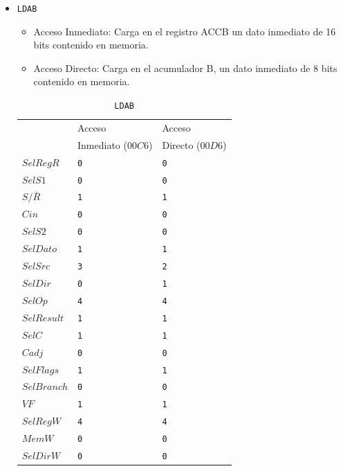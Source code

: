 \documentclass{IEEEtran}
\newenvironment{code}{\captionsetup{type=listing}}{}
\begin{document}
\begin{itemize}
\item \texttt{LDAB}
\begin{itemize}
\item Acceso Inmediato: Carga en el registro ACCB un dato inmediato de 16 bits contenido en memoria.
\item Acceso Directo: Carga en el acumulador B, un dato inmediato de 8 bits contenido en memoria.
\end{itemize}
\begin{table}[htbp]
\caption{\texttt{LDAB}}
\centering
\begin{tabular}{lll}
\hline
 & Acceso & Acceso\\
 & Inmediato (\(00C6\)) & Directo (\(00D6\))\\
\hline
\(SelRegR\) & \texttt{0} & \texttt{0}\\
\(SelS1\) & \texttt{0} & \texttt{0}\\
\(S/\bar{R}\) & \texttt{1} & \texttt{1}\\
\(Cin\) & \texttt{0} & \texttt{0}\\
\(SelS2\) & \texttt{0} & \texttt{0}\\
\(SelDato\) & \texttt{1} & \texttt{1}\\
\(SelSrc\) & \texttt{3} & \texttt{2}\\
\(SelDir\) & \texttt{0} & \texttt{1}\\
\(SelOp\) & \texttt{4} & \texttt{4}\\
\(SelResult\) & \texttt{1} & \texttt{1}\\
\(SelC\) & \texttt{1} & \texttt{1}\\
\(Cadj\) & \texttt{0} & \texttt{0}\\
\(SelFlags\) & \texttt{1} & \texttt{1}\\
\(SelBranch\) & \texttt{0} & \texttt{0}\\
\(VF\) & \texttt{1} & \texttt{1}\\
\(SelRegW\) & \texttt{4} & \texttt{4}\\
\(MemW\) & \texttt{0} & \texttt{0}\\
\(SelDirW\) & \texttt{0} & \texttt{0}\\
\hline
\end{tabular}
\end{table}
\begin{code}
\caption{\texttt{LDAB} ($00C6$) de acceso inmediato en \texttt{u\_control.vhd}}
\inputminted[firstline=73, lastline=91]{vhdl}{../Risc/u_control.vhd}
\end{code}

\end{itemize}
\end{document}
